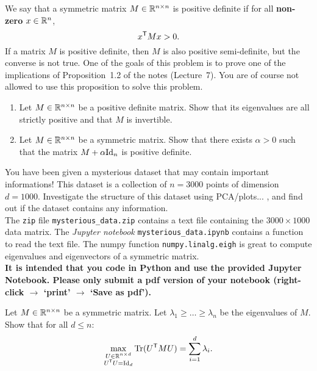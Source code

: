 \documentclass[11pt,nocut]{article}
\begin{document}
\begin{problem}[3 points]
	We say that a symmetric matrix $M \in \mathbb{R}^{n \times n}$ is positive definite if for all \textbf{non-zero} $x \in \mathbb{R}^n$,
	$$
	x^{{\sf T}} M x > 0.
	$$
	If a matrix $M$ is positive definite, then $M$ is also positive semi-definite, but the converse is not true. One of the goals of this problem is to prove one of the implications of Proposition~1.2 of the notes (Lecture~7). You are of course not allowed to use this proposition to solve this problem.
	\begin{enumerate}[label=\normalfont(\textbf{\alph*})]
		\item Let $M \in \mathbb{R}^{n \times n}$ be a positive definite matrix. Show that its eigenvalues are all strictly positive and that $M$ is invertible. 
		\item Let $M \in \mathbb{R}^{n \times n}$ be a symmetric matrix. Show that there exists $\alpha > 0$ such that the matrix $M + \alpha {{\rm Id}}_n$ is positive definite.
	\end{enumerate}
\end{problem}

\vspace{1mm}


\begin{problem}[4 points]
	You have been given a mysterious dataset that may contain important informations! This dataset is a collection of $n=3000$ points of dimension $d=1000$.
	Investigate the structure of this dataset using PCA/plots... , and find out if the dataset contains any information.
	\\

	The \texttt{zip} file \texttt{mysterious\_data.zip} contains a text file containing the $3000 \times 1000$ data matrix.
	The \emph{Jupyter notebook} \texttt{mysterious\_data.ipynb} contains a function to read the text file.
	The numpy function \texttt{numpy.linalg.eigh} is great to compute eigenvalues and eigenvectors of a symmetric matrix.	
	\\

	\textbf{It is intended that you code in Python and use the provided Jupyter Notebook. Please only submit a pdf version of your notebook (right-click $\to$ `print' $\to$ `Save as pdf').}
\end{problem}


\vspace{1mm}




\begin{problem}[$\star$]
	Let $M \in \mathbb{R}^{n \times n}$ be a symmetric matrix. Let $\lambda_1 \geq \dots \geq \lambda_n$ be the eigenvalues of $M$. Show that for all $d \leq n$:
	$$
	\max_{\substack{U \in \mathbb{R}^{n\times d} \\ U^{{\sf T}} U = {{\rm Id}}_d}} {{\rm Tr}}(U^{{\sf T}} M U) = \sum_{i=1}^d \lambda_i.
	$$
\end{problem}
\vspace{1cm}
\centerline{}

%
%
\end{document}
